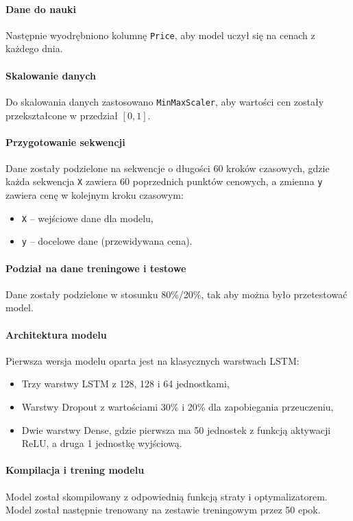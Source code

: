 \paragraph{Dane do nauki}
Następnie wyodrębniono kolumnę \texttt{Price}, aby model uczył się na cenach z każdego dnia.

\paragraph{Skalowanie danych}
Do skalowania danych zastosowano \texttt{MinMaxScaler}, aby wartości cen zostały przekształcone w przedział \([0, 1]\).


\paragraph{Przygotowanie sekwencji}
Dane zostały podzielone na sekwencje o długości 60 kroków czasowych, gdzie każda sekwencja \texttt{X} zawiera 60 poprzednich punktów cenowych, a zmienna \texttt{y} zawiera cenę w kolejnym kroku czasowym:
\begin{itemize}
    \item \texttt{X} – wejściowe dane dla modelu,
    \item \texttt{y} – docelowe dane (przewidywana cena).
\end{itemize}

\paragraph{Podział na dane treningowe i testowe}
Dane zostały podzielone w stosunku 80\%/20\%, tak aby można było przetestować model.

\paragraph{Architektura modelu}

Pierwsza wersja modelu oparta jest na klasycznych warstwach LSTM:
\begin{itemize}
    \item Trzy warstwy LSTM z 128, 128 i 64 jednostkami,
    \item Warstwy Dropout z wartościami 30\% i 20\% dla zapobiegania przeuczeniu,
    \item Dwie warstwy Dense, gdzie pierwsza ma 50 jednostek z funkcją aktywacji ReLU, a druga 1 jednostkę wyjściową.
\end{itemize}

\paragraph{Kompilacja i trening modelu}
Model został skompilowany z odpowiednią funkcją straty i optymalizatorem. Model został następnie trenowany na zestawie treningowym przez 50 epok.

